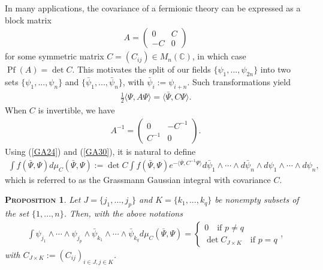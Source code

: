 \documentclass[12pt,twoside]{amsart}
\newtheorem{prop}{\textsc{Proposition}} [section]
\numberwithin{equation}{section}
\begin{document}
In many applications, the covariance of a fermionic theory can be expressed as a block matrix
\begin{eqnarray}
A = \begin{pmatrix}
0 & C \\
-C & 0 
\end{pmatrix}
\label{GA29}
\end{eqnarray}
for some symmetric matrix $C = (C_{ij}) \in M_{n}(\mathbb{C})$, in which case $\operatorname{Pf}(A) = \operatorname{det}C$. This motivates the split of our fields $\{\psi_{1},...,\psi_{2n}\}$ into two sets $\{\psi_{1},...,\psi_{n}\}$ and $\{\bar{\psi}_{1},...,\bar{\psi}_{n}\}$, with $\bar{\psi}_{i} := \psi_{i+n}$. Such transformations yield
\begin{eqnarray}
\frac{1}{2}\langle \Psi, A\Psi \rangle = \langle \bar{\Psi},C\Psi\rangle. \label{GA30}
\end{eqnarray}
When $C$ is invertible, we have
\begin{eqnarray}
A^{-1} = \begin{pmatrix}
0 & -C^{-1} \\
C^{-1} & 0 
\end{pmatrix}
.\label{GA31}
\end{eqnarray}
Using (\ref{GA24}) and (\ref{GA30}), it is natural to define
\begin{eqnarray}
\int f(\bar{\Psi},\Psi)d\mu_{C}(\bar{\Psi},\Psi) := \det C\int f(\bar{\Psi},\Psi)e^{-\langle \bar{\Psi},C^{-1}\Psi\rangle}d\bar{\psi}_{1}\wedge \cdots \wedge d\bar{\psi}_{n}\wedge d\psi_{1}\wedge \cdots \wedge d\psi_{n}, \label{GA32}
\end{eqnarray}
which is referred to as the Grassmann Gaussian integral with covariance $C$. 

\begin{prop}\label{gaussiancorrelationsbarredunbarred} Let $J = \{j_{1},...,j_{p}\}$ and $K = \{k_{1},...,k_{q}\}$ be nonempty subsets of the set $\{1,...,n\}$. Then, with the above notations
\begin{eqnarray}
\int \psi_{j_{1}}\wedge \cdots \wedge \psi_{j_{p}}\wedge \bar{\psi}_{k_{1}}\wedge \cdots \wedge \bar{\psi}_{k_{q}}d\mu_{C}(\bar{\Psi},\Psi) = \begin{cases}
\displaystyle 0 \quad \mbox{if $p \neq q$} \\
\displaystyle \operatorname{det}C_{J\times K} \quad \mbox{if $p=q$} 
\end{cases}
,\label{GA33}
\end{eqnarray}
with $C_{J\times K} :=(C_{ij})_{i\in J, j \in K}$.
\end{prop}
\end{document}
